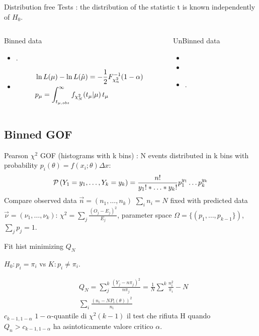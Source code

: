\documentclass[asd-beamer.tex]{subfiles}
\begin{document}
\begin{frame}{Distribution free Tests}
: the distribution of the statistic t is known independently of $H_0$.
\begin{columns}[T]
\begin{column}{0.5\textwidth}
\begin{block}{Binned data}
\begin{itemize}
\item {}.
\item {}
\begin{align*}
&\ln{L(\mu)}-\ln{L(\hat{\mu})}=-\frac{1}{2}{F}^{-1}_{\chi_n^2}(1-\alpha)\\
&p_{\mu}=\int_{t_{\mu,obs}}^{\infty}f_{\chi^2_N}(t_{\mu}|\mu)\,t_{\mu}
\end{align*}
\end{itemize}
\end{block}
\end{column}
\begin{column}{0.5\textwidth}
\begin{block}{UnBinned data}
\begin{itemize}
\item {}
\item {}
\item {}.
\end{itemize}
\end{block}
\end{column}
\end{columns}
\end{frame}

\subsection{Binned GOF}\label{binnedgof}

\begin{frame}{Pearson $\chi^2$ GOF (histograms with k bins)}
: N events distributed in k bins with probability $p_i(\theta)=f(x_i;\theta)\Delta x$:
\[\operatorname{\mathcal{P}}{(Y_1=y_1,\ldots,Y_{k}=y_{k})}=\frac{n!}{y_1!*\ldots*y_{k}!}p_1^{y_1}\ldots p_{k}^{y_{k}}\]
Compare observed data $\vec{n}=(n_1,\ldots,n_k)$ $\sum_in_i=N$ fixed with predicted data $\vec{\nu}=(\nu_1,\ldots,\nu_k)$: $\chi^2=\sum_j\frac{(O_j-E_j)^2}{E_j}$, parameter space $\Omega=\{(p_1,\ldots,p_{k-1}\})$, $\sum_jp_j=1$.

Fit hist minimizing $Q_N$

$H_0: p_i=\pi_i$ vs $K: p_i\neq\pi_i$.

\begin{align*}
&Q_N=\sum_j^{k}\frac{(Y_j-n\pi_j)^2}{n\pi_j}=\frac{1}{N}\sum^{k}\frac{n_i^2}{\pi_i}-N\tag{asintot. $\chi^2(k-1)$}\\
&\sum_i\frac{(n_i-NP_i(\theta))^2}{n_i}\tag{Neyman $\chi^2$}
\end{align*}
$c_{k-1,1-\alpha}$ $1-\alpha$-quantile di $\chi^2(k-1)$ il test che rifiuta H quando $Q_n>c_{k-1,1-\alpha}$ ha asintoticamente valore critico $\alpha$.
\end{frame}
\end{document}
